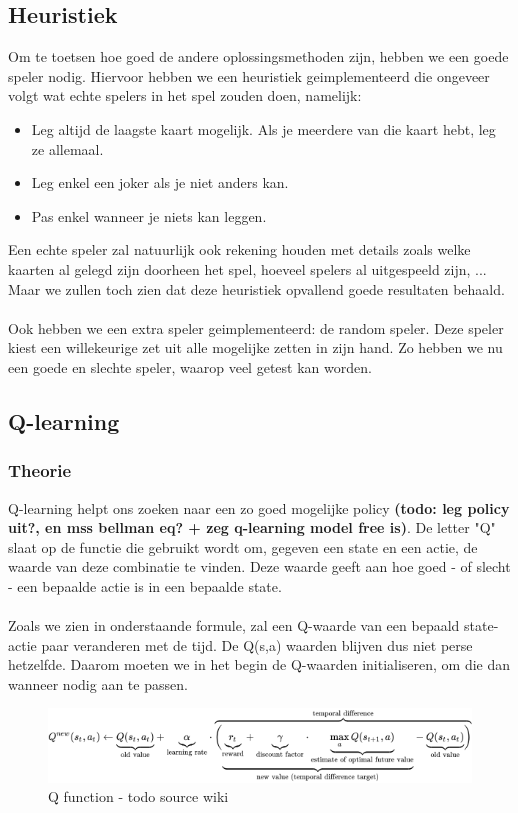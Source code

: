 \documentclass[11pt]{article}
\begin{document}
\subsection{Heuristiek}

Om te toetsen hoe goed de andere oplossingsmethoden zijn, hebben we een goede speler nodig. Hiervoor hebben we een heuristiek geimplementeerd die ongeveer volgt wat echte spelers in het spel zouden doen, namelijk:
\begin{itemize}
	\item Leg altijd de laagste kaart mogelijk. Als je meerdere van die kaart hebt, leg ze allemaal.
	\item Leg enkel een joker als je niet anders kan.
	\item Pas enkel wanneer je niets kan leggen.
\end{itemize}
Een echte speler zal natuurlijk ook rekening houden met details zoals welke kaarten al gelegd zijn doorheen het spel, hoeveel spelers al uitgespeeld zijn, ... Maar we zullen toch zien dat deze heuristiek opvallend goede resultaten behaald. \\\\
Ook hebben we een extra speler geimplementeerd: de random speler. Deze speler kiest een willekeurige zet uit alle mogelijke zetten in zijn hand. Zo hebben we nu een goede en slechte speler, waarop veel getest kan worden.


\subsection{Q-learning}
\subsubsection{Theorie}
Q-learning helpt ons zoeken naar een zo goed mogelijke policy \textbf{(todo: leg policy uit?, en mss bellman eq? + zeg q-learning model free is)}. De letter "Q" slaat op de functie die gebruikt wordt om, gegeven een state en een actie, de waarde van deze combinatie te vinden. Deze waarde geeft aan hoe goed - of slecht - een bepaalde actie is in een bepaalde state.\\\\
Zoals we zien in onderstaande formule, zal een Q-waarde van een bepaald state-actie paar veranderen met de tijd. De Q(s,a) waarden blijven dus niet perse hetzelfde. Daarom moeten we in het begin de Q-waarden initialiseren, om die dan wanneer nodig aan te passen.

\begin{figure}[h]
\centering
\includegraphics[scale=0.70]{images/qformula.png}
\caption{Q function - todo source wiki}
\end{figure}
\end{document}
